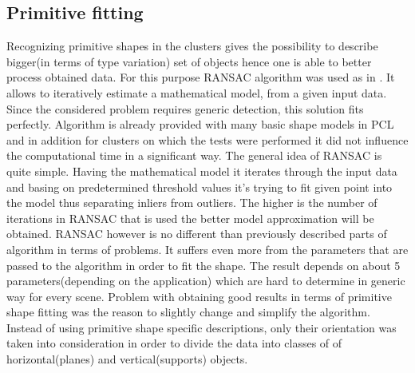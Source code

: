 \documentclass[12pt,oneside]{amsart}
\begin{document}
\subsection{Primitive fitting}
Recognizing primitive shapes in the clusters gives the possibility to describe bigger(in terms of type variation) set of objects hence one is able to better process obtained data. For this purpose RANSAC algorithm was used as in \cite{pap1}. It allows to iteratively estimate a mathematical model, from a given input data. Since the considered problem requires generic detection, this solution fits perfectly. Algorithm is already provided with many basic shape models in PCL and in addition for clusters on which the tests were performed it did not influence the computational time in a significant way.
\newline
\indent The general idea of RANSAC is quite simple. Having the mathematical model it iterates through the input data and basing on predetermined threshold values it's trying to fit given point into the model thus separating inliers from outliers. The higher is the number of iterations in RANSAC that is used the better model approximation will be obtained.
\newline
\indent RANSAC however is no different than previously described parts of algorithm in terms of problems. It suffers even more from the parameters that are passed to the algorithm in order to fit the shape. The result depends on about 5 parameters(depending on the application) which are hard to determine in generic way for every scene. Problem with obtaining good results in terms of primitive shape fitting was the reason to slightly change and simplify the algorithm. Instead of using primitive shape specific descriptions, only their orientation was taken into consideration in order to divide the data into classes of of horizontal(planes) and vertical(supports) objects.  
\end{document}

